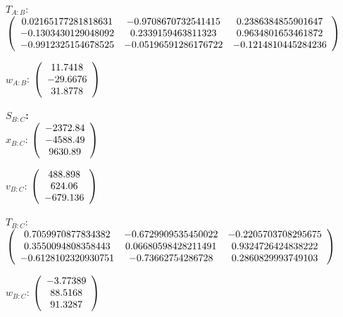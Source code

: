 \begin{description}
$T_{A:B}$:   $\left( \begin{array} {ccc}
 0.02165177281818631 & -0.9708670732541415 & 0.2386384855901647 \\
  -0.1303430129048092 & 0.2339159463811323 & 0.9634801653461872 \\
   -0.9912325154678525 & -0.05196591286176722 & -0.1214810445284236
\end{array} \right) \\ \\$

$w_{A:B}$:   $\left( \begin{array} {ccc}
 11.7418 \\ -29.6676 \\ 31.8778
\end{array} \right)\\ \\$

\Large{\textbf{$S_{B:C}$:}} \normalsize \\

$x_{B:C}$: $\left( \begin{array} {ccc} -2372.84 \\   -4588.49 \\ 9630.89
\end{array} \right)\\ \\$

$v_{B:C}$:  $\left( \begin{array} {ccc}  488.898 \\ 624.06 \\ -679.136
\end{array} \right)\\ \\$

$T_{B:C}$: $\left( \begin{array} {ccc}
 0.7059970877834382 & -0.6729909535450022 & -0.2205703708295675 \\
  0.3550094808358443 & 0.06680598428211491 & 0.9324726424838222 \\
   -0.6128102320930751 & -0.73662754286728 & 0.2860829993749103
\end{array} \right)\\ \\$

$w_{B:C}$:  $\left( \begin{array} {ccc}  -3.77389 \\  88.5168 \\  91.3287
\end{array} \right)\\ \\$



\end{description}
